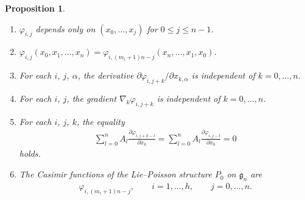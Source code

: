 \documentclass[pdftex]{sigma}
\numberwithin{equation}{section}
\newtheorem{Proposition}[Theorem]{Proposition}
 { \theoremstyle{definition}
\newtheorem{Example}[Theorem]{Example}}
\begin{document}
\begin{Proposition}\label{proposition2.1}\quad
\begin{enumerate}\itemsep=0pt
\item[$(i)$] $\varphi _{i,j}$ depends only on $(x_0, \dots ,x_j)$ for $0\leq j\leq n-1$.
\item[$(ii)$] $\varphi _{i,j}(x_0, x_1,\dots ,x_n) = \varphi _{i, (m_i+1)n-j} (x_n, \dots ,x_1,x_0)$.
\item[$(iii)$] For each $i$, $j$, $\alpha $, the derivative $\partial \varphi _{i,j+k}/\partial x_{k,\alpha }$ is independent of $k=0,\dots ,n$.
\item[$(iv)$] For each $i$, $j$, the gradient $\nabla _k \varphi _{i,j+k}$ is independent of $k=0,\dots ,n$.
\item[$(v)$] For each $i$, $j$, $k$, the equality
\begin{gather*}
\sum^n_{l=0}A_l \frac{\partial \varphi _{i,j+k-l}}{\partial x_k}
 = \sum^n_{l=0}A_l \frac{\partial \varphi _{i,j-l}}{\partial x_0} = 0
\end{gather*}
holds.
\item[$(vi)$] The Casimir functions of the Lie--Poisson structure $P_0$ on $\mathfrak{g}_n$ are
\begin{gather*}
\varphi _{i,(m_i+1)n-j}, \qquad i=1,\dots ,h,\qquad j=0,\dots ,n.
\end{gather*}
\end{enumerate}
\end{Proposition}
\end{document}
